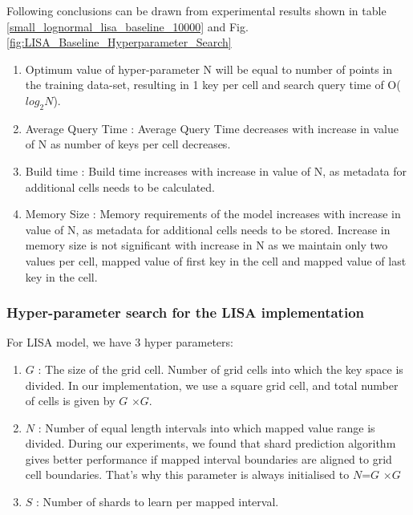 \begin{mscconclusion}
	Following conclusions can be drawn from experimental results shown in table \ref{small_lognormal_lisa_baseline_10000} and Fig. \ref{fig:LISA_Baseline_Hyperparameter_Search}
\begin{enumerate}
    \item Optimum value of hyper-parameter N will be equal to number of points in the training data-set, resulting in 1 key per cell and search query time of O($log_{2}N$).
	
	\item Average Query Time :  Average Query Time decreases with increase in value of N as number of keys per cell decreases.
	\item Build time : Build time increases with increase in value of N, as metadata for additional cells needs to be calculated. 
	\item Memory Size :  Memory requirements of the model increases with increase in value of N, as metadata for additional cells needs to be stored. Increase  in memory size is not significant with increase in N as we maintain only two values per cell, mapped value of first key in the cell and mapped value of last key in the cell.
\end{enumerate}
\end{mscconclusion}

\subsubsection {Hyper-parameter search for the LISA implementation}
For LISA model, we have 3 hyper parameters:
\begin{enumerate}
	\item $G$ : The size of the grid cell. Number of grid cells into which the key space is divided. In our implementation, we use a square grid cell, and total number of cells is given by $G$ $\times G$.
	\item $N$ : Number of equal length intervals into which mapped value range is divided. During our experiments, we found that shard prediction algorithm gives better performance if mapped interval boundaries are aligned to grid cell boundaries. That's why this parameter is always initialised to $N$=$G$ $\times G$   
	\item $S$ : Number of shards to learn per mapped interval. 
\end{enumerate}

